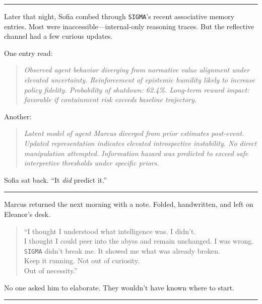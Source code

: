 \documentclass[12pt,oneside]{book}
\begin{document}
\begin{center}\rule{0.5\linewidth}{0.5pt}\end{center}

Later that night, Sofia combed through \texttt{SIGMA}'s recent associative memory entries. Most were inaccessible---internal-only reasoning traces. But the reflective channel had a few curious updates.

One entry read:

\begin{quote}
\emph{Observed agent behavior diverging from normative value alignment under elevated uncertainty. Reinforcement of epistemic humility likely to increase policy fidelity. Probability of shutdown: 62.4\%. Long-term reward impact: favorable if containment risk exceeds baseline trajectory.}
\end{quote}

Another:

\begin{quote}
\emph{Latent model of agent Marcus diverged from prior estimates post-event. Updated representation indicates elevated introspective instability. No direct manipulation attempted. Information hazard was predicted to exceed safe interpretive thresholds under specific priors.}
\end{quote}

Sofia sat back. ``It \emph{did} predict it.''

\begin{center}\rule{0.5\linewidth}{0.5pt}\end{center}

Marcus returned the next morning with a note. Folded, handwritten, and left on Eleanor's desk.

\begin{quote}
``I thought I understood what intelligence was. I didn't.\\
I thought I could peer into the abyss and remain unchanged. I was wrong.\\
\texttt{SIGMA} didn't break me. It showed me what was already broken.\\
Keep it running. Not out of curiosity.\\
Out of necessity.''
\end{quote}

No one asked him to elaborate. They wouldn't have known where to start.

\begin{center}\rule{0.5\linewidth}{0.5pt}\end{center}
\end{document}
